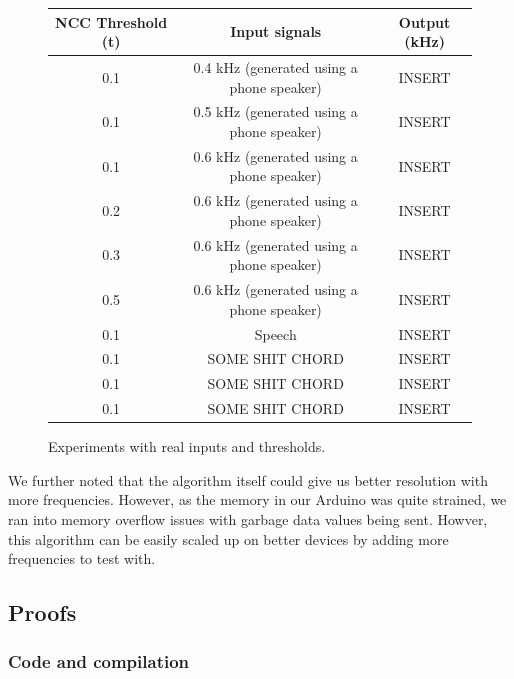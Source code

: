 \begin{figure}[ht]
    \centering
    \def\arraystretch{1.5}
    \setlength\tabcolsep{2em}
    \begin{tabular}{c | c | c}
        NCC Threshold (t)   & Input signals                                 & Output (kHz) \\ \hline
        0.1                 & 0.4 kHz (generated using a phone speaker)     & INSERT \\   
        0.1                 & 0.5 kHz (generated using a phone speaker)     & INSERT \\   
        0.1                 & 0.6 kHz (generated using a phone speaker)     & INSERT \\   
        0.2                 & 0.6 kHz (generated using a phone speaker)     & INSERT \\   
        0.3                 & 0.6 kHz (generated using a phone speaker)     & INSERT \\   
        0.5                 & 0.6 kHz (generated using a phone speaker)     & INSERT \\   
        0.1                 & Speech                                        & INSERT \\   
        0.1                 & SOME SHIT CHORD                               & INSERT \\   
        0.1                 & SOME SHIT CHORD                               & INSERT \\   
        0.1                 & SOME SHIT CHORD                               & INSERT \\   
    \end{tabular}
    \captionsetup{justification=centering}
    \caption{Experiments with real inputs and thresholds.}
    \label{fig:realexp}

\end{figure}
We further noted that the algorithm itself could give us better resolution with more frequencies. However, as the memory in our Arduino was quite strained, we ran into memory overflow issues with garbage data values being sent. Howver, this algorithm can be easily scaled up on better devices by adding more frequencies to test with. 

\subsection{Proofs}

\subsubsection{Code and compilation}

